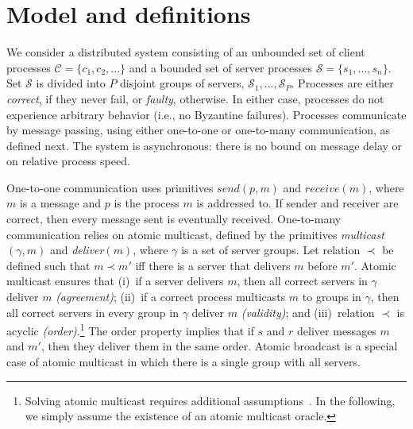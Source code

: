 \documentclass[10pt, conference, compsocconf, letterpaper]{IEEEtranv17}
\newcommand{\ccm}{\mathcal{C}}
\newcommand{\ssm}{\mathcal{S}}
\begin{document}


\section{Model and definitions}
\label{sec:model}

%

We consider a distributed system consisting of an unbounded set of client processes $\ccm = \{c_1, c_2, ...\}$ and a bounded set of server processes $\ssm = \{s_1, ..., s_n\}$. 
Set $\ssm$ is divided into $P$ disjoint groups of servers, $\ssm_1, ..., \ssm_P$.
Processes are either \emph{correct}, if they never fail, or \emph{faulty}, otherwise. 
In either case, processes do not experience arbitrary behavior (i.e., no Byzantine failures).
Processes communicate by message passing, using either one-to-one or one-to-many communication, as defined next.
The system is asynchronous: there is no bound on message delay or on relative process speed.

One-to-one communication uses primitives $send(p,m)$ and $receive(m)$, where $m$ is a message and $p$ is the process $m$ is addressed to. 
If sender and receiver are correct, then every message sent is eventually received. 
%
One-to-many communication relies on atomic multicast, defined by the primitives \emph{multicast}$(\gamma, m)$ and \emph{deliver}$(m)$, where $\gamma$ is a set of server groups.
%
Let relation $\prec$ be defined such that $m \prec m'$ iff there is a server that delivers $m$ before $m'$.
Atomic multicast ensures that 
(i)~if a server delivers $m$, then all correct servers in $\gamma$ deliver $m$ \emph{(agreement)};
(ii)~if a correct process multicasts $m$ to groups in $\gamma$, then all correct servers in every group in $\gamma$ deliver $m$ \emph{(validity)}; and
(iii)~relation $\prec$ is acyclic \emph{(order)}.\footnote{Solving atomic multicast requires additional assumptions~\cite{CT96,FLP85}. In the following, we simply assume the existence of an atomic multicast oracle.}
The order property implies that if $s$ and $r$ deliver messages $m$ and $m'$, then they deliver them in the same order. 
Atomic broadcast is a special case of atomic multicast in which there is a single group with all servers.
\end{document}
